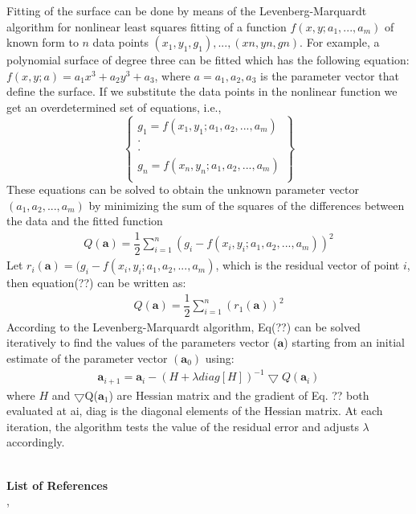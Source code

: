 Fitting of the surface can be done by means of the Levenberg-Marquardt algorithm for nonlinear least squares fitting of a function $f(x, y; a_{1}, ..., a_{m})$ of known form to $n$ data points ${(x_{1}, y_{1}, g_{1}), ...,(xn, yn, gn)}$. For example, a polynomial surface of degree three can be fitted which has the following equation: $f(x, y; a) = a_{1}x^{3} + a_{2}y^{3} + a_{3}$, where $a = {a_{1}, a_{2}, a_{3}}$ is the parameter vector that define the surface. If we substitute the data points in the nonlinear function we get an overdetermined set of equations, i.e.,
\begin{equation}
\begin{Bmatrix}
g_{1} = f(x_{1}, y_{1}; a_{1}, a_{2}, ..., a_{m})\\ 
\cdot                                            \\
\cdot                                            \\ 
g_{n} = f(x_{n}, y_{n}; a_{1}, a_{2}, ..., a_{m})\\ 
\end{Bmatrix}
\end{equation}
These equations can be solved to obtain the unknown parameter vector $(a_{1}, a_{2}, ..., a_{m})$ by minimizing the sum of the squares of the differences between the data and the fitted function
\begin{equation}
\begin{aligned}
Q(\textbf{a})=\dfrac{1}{2} \sum_{i=1}^{n}(g_{i} - f(x_{i},y_{i}; a_{1},a_{2}, ...,a_{m}))^{2}
\end{aligned}
\end{equation}
Let $r_{i}(\textbf{a}) = (g_{i} - f( x_{i}, y_{i}; a_{1}, a_{2}, ..., a_{m})$, which is the residual vector of point $i$, then equation(??) can be written as:
\begin{equation}
\begin{aligned}
Q(\textbf{a})=\dfrac{1}{2} \sum_{i=1}^{n}(r_{1}(\textbf{a}))^{2}
\end{aligned}
\end{equation}
According to the Levenberg-Marquardt algorithm, Eq(??) can be solved iteratively to find the values of the parameters vector ($\textbf{a}$) starting from an initial estimate of the parameter vector $(\textbf{a}_{0})$ using:
\begin{equation}
\begin{aligned}
\textbf{a}_{i+1} = \textbf{a}_{i} - (H + \lambda diag[H])^{-1} \bigtriangledown Q(\textbf{a}_{i})
\end{aligned}
\end{equation}
where $H$ and $\bigtriangledown$Q($\textbf{a}_{1}$) are Hessian matrix and the gradient of Eq. ?? both evaluated at ai, diag is the diagonal elements of the Hessian matrix. At each iteration, the algorithm tests the value of the residual error  and adjusts $\lambda$ accordingly.

\hfill{}\\
\textbf{List of References}\\
\cite{2a1}, \cite{2a2}